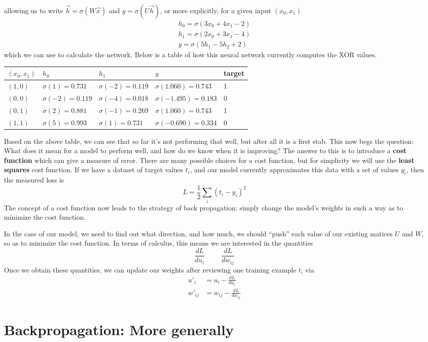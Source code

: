 \documentclass[12pt,letterpaper]{book}
\theoremstyle{definition}
\begin{document}
  allowing us to write $\vec{h} = \sigma(W\vec{x})$ and $y = \sigma(U\vec{h})$, 
  or more explicitly, for a given input $(x_0, x_1)$
  \begin{align}
    h_0 = \sigma(3x_0 + 4x_1 -2)\\
    h_1 = \sigma(2x_0 + 3x_1 -4)\\
    y = \sigma(5h_1 - 5h_2 + 2)
  \end{align}
  which we can use to calculate the network.
  Below is a table of how this neural network currently computes the XOR values.
  \begin{center}
    \begin{tabular}{ |p{1.5cm}||p{3cm}|p{3cm}|p{3.5cm}|p{1.5cm}| }
      \hline
      $(x_0, x_1)$ & $h_0$ & $h_1$ & $y$ & target\\
      \hline
      $(1, 0)$ & $\sigma(1) = 0.731$ & $\sigma(-2) = 0.119$ & $\sigma(1.060) = 0.743$ & 1 \\
      \hline
      $(0, 0)$ & $\sigma(-2) = 0.119$ & $\sigma(-4) = 0.018$ & $\sigma(-1.495) = 0.183$  & 0\\
      \hline
      $(0, 1)$ & $\sigma(2) = 0.881$ & $\sigma(-1) = 0.269$ & $\sigma(1.060) = 0.743$ & 1 \\
      \hline
      $(1, 1)$ & $\sigma(5) = 0.993$ & $\sigma(1) = 0.731$ & $\sigma(-0.690) = 0.334$ & 0\\
      \hline
     \end{tabular}
     
  \end{center}
  Based on the above table, we can see that so far it's not performing that well, but after 
  all it is a first stab. This now begs the question: What does it 
  mean for a model to perform well, and how do we know when it is improving? The answer
  to this is to introduce a \textbf{cost function} which can give a measure of error. There are 
  many possible choices for a cost function, but for simplicity we will use the \textbf{least squares}
  cost function. If we have a dataset of target values $t_i$, and our model currently 
  approximates this data with a set of values $y_i$, then the measured loss is 
  \[
      L = \frac{1}{2}\sum_{i}(t_i - y_i)^2
  \]  
  The concept of a cost function now leads to the strategy of back propagation: simply change the 
  model's weights in such a way as to minimize the cost function.

  In the case of our model, we need to find out what direction, and how much, we should ``push'' each 
  value of our existing matices $U$ and $W$, so as to minimize the cost function. 
  In terms of calculus, this means we are interested in the quantities 
  \[
      \frac{dL}{du_i} \hspace{1cm} \frac{dL}{dw_{ij}}
  \]
  Once we obtain these quantities, we can update our weights after reviewing one training
  example $t_i$ via
  \begin{align}
    u'_i &= u_i - \frac{dL}{du_i} \\
    w'_{ij}  &= w_{ij} - \frac{dL}{dw_{ij}}
  \end{align}

  

  
  \section{Backpropagation: More generally}
\end{document}
